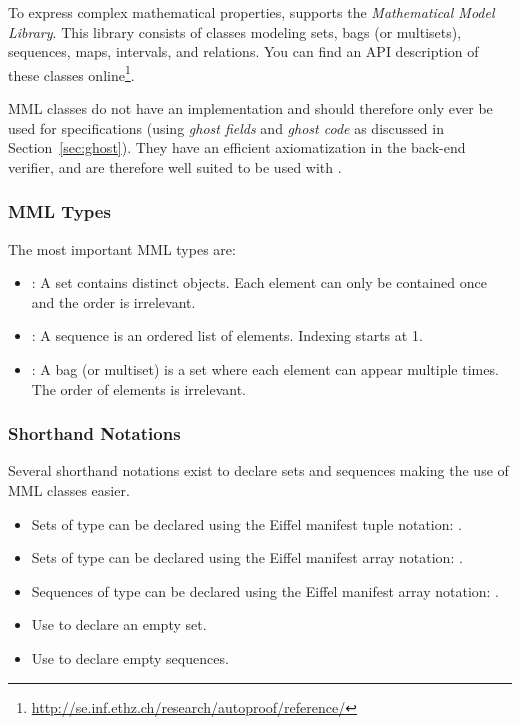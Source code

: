 To express complex mathematical properties, \AutoProof supports the \emph{Mathematical Model Library}. This library consists of classes modeling sets, bags (or multisets), sequences, maps, intervals, and relations. You can find an API description of these classes online\footnote{\url{http://se.inf.ethz.ch/research/autoproof/reference/}}.

MML classes do not have an implementation and should therefore only ever be used for specifications (using \emph{ghost fields} and \emph{ghost code} as discussed in Section~\ref{sec:ghost}). They have an efficient axiomatization in the back-end verifier, and are therefore well suited to be used with \AutoProof.

\subsubsection*{MML Types}

The most important MML types are:
\begin{itemize}
\item {}: A set contains distinct objects. Each element can only be contained once and the order is irrelevant.
\item {}: A sequence is an ordered list of elements. Indexing starts at 1.
\item {}: A bag (or multiset) is a set where each element can appear multiple times. The order of elements is irrelevant.
\end{itemize}

\subsubsection*{Shorthand Notations}

Several shorthand notations exist to declare sets and sequences making the use of MML classes easier.
\begin{itemize}
\item Sets of type  can be declared using the Eiffel manifest tuple notation: .
\item Sets of type  can be declared using the Eiffel manifest array notation: .
\item Sequences of type  can be declared using the Eiffel manifest array notation: .
\item Use  to declare an empty set.
\item Use  to declare empty sequences.
\end{itemize}


